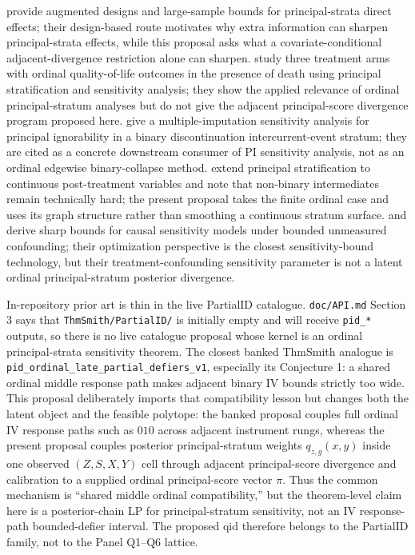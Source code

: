 \documentclass[11pt]{article}
\theoremstyle{definition}
\theoremstyle{plain}
\theoremstyle{remark}
\begin{document}
\citet{MatteiMealli2011} provide augmented designs and large-sample bounds for principal-strata direct effects; their design-based route motivates why extra information can sharpen principal-strata effects, while this proposal asks what a covariate-conditional adjacent-divergence restriction alone can sharpen.  \citet{LeeDanielsSargent2010} study three treatment arms with ordinal quality-of-life outcomes in the presence of death using principal stratification and sensitivity analysis; they show the applied relevance of ordinal principal-stratum analyses but do not give the adjacent principal-score divergence program proposed here.  \citet{WangZhangMealliBornkamp2023} give a multiple-imputation sensitivity analysis for principal ignorability in a binary discontinuation intercurrent-event stratum; they are cited as a concrete downstream consumer of PI sensitivity analysis, not as an ordinal edgewise binary-collapse method.  \citet{LuJiangDing2024} extend principal stratification to continuous post-treatment variables and note that non-binary intermediates remain technically hard; the present proposal takes the finite ordinal case and uses its graph structure rather than smoothing a continuous stratum surface.  \citet{DornGuoKallus2022} and \citet{FrauenMelnychukFeuerriegel2023} derive sharp bounds for causal sensitivity models under bounded unmeasured confounding; their optimization perspective is the closest sensitivity-bound technology, but their treatment-confounding sensitivity parameter is not a latent ordinal principal-stratum posterior divergence.

In-repository prior art is thin in the live PartialID catalogue.  \texttt{doc/API.md} Section 3 says that \texttt{ThmSmith/PartialID/} is initially empty and will receive \texttt{pid\_*} outputs, so there is no live catalogue proposal whose kernel is an ordinal principal-strata sensitivity theorem.  The closest banked ThmSmith analogue is \texttt{pid\_ordinal\_late\_partial\_defiers\_v1}, especially its Conjecture 1: a shared ordinal middle response path makes adjacent binary IV bounds strictly too wide.  This proposal deliberately imports that compatibility lesson but changes both the latent object and the feasible polytope: the banked proposal couples full ordinal IV response paths such as \(010\) across adjacent instrument rungs, whereas the present proposal couples posterior principal-stratum weights \(q_{z,g}(x,y)\) inside one observed \((Z,S,X,Y)\) cell through adjacent principal-score divergence and calibration to a supplied ordinal principal-score vector \(\pi\).  Thus the common mechanism is ``shared middle ordinal compatibility,'' but the theorem-level claim here is a posterior-chain LP for principal-stratum sensitivity, not an IV response-path bounded-defier interval.  The proposed qid therefore belongs to the PartialID family, not to the Panel Q1--Q6 lattice.
\end{document}
